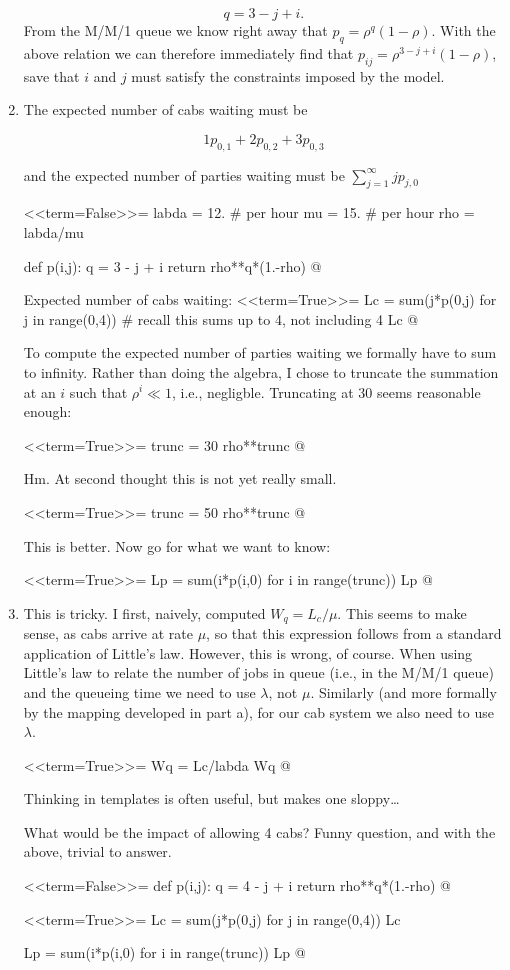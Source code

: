 \begin{question}
\begin{solution}
\begin{enumerate}
\begin{equation*}
q = 3 - j +i.
\end{equation*}
From the M/M/1 queue we know right away that $p_q = \rho^q
(1-\rho)$.  With the above relation we can therefore immediately find
that $p_{ij} = \rho^{3-j+i}(1-\rho)$, save that $i$ and
$j$ must satisfy the constraints imposed by the model.
\item       
The expected number of cabs waiting must be 

\begin{equation*}
1p_{0,1} + 2 p_{0,2} + 3p_{0,3}
\end{equation*}

and the expected number of parties waiting must be $\sum_{j=1}^\infty j p_{j,0}$

<<term=False>>=
labda = 12. # per hour
mu = 15. # per hour
rho = labda/mu

def p(i,j):
    q  = 3 - j + i
    return rho**q*(1.-rho)
@ 

Expected number of  cabs waiting:
<<term=True>>=
Lc = sum(j*p(0,j) for j in range(0,4)) # recall this sums up to 4, not including 4
Lc
@ 


To compute the expected number of parties waiting we formally have to
sum to infinity. Rather than doing the algebra, I chose to truncate
the summation at an $i$ such that $\rho^i \ll 1$, i.e.,
negligble.  Truncating at 30 seems reasonable enough:

<<term=True>>=
trunc = 30
rho**trunc
@ 

Hm. At second thought this is not yet really small. 

<<term=True>>=
trunc = 50
rho**trunc
@ 


This is better. Now go for what we want to know:

<<term=True>>=
Lp = sum(i*p(i,0) for i in range(trunc))
Lp
@ 

\item 
This is tricky. I first, naively, computed $W_q = L_c/\mu$. This
seems to make sense, as cabs arrive at rate $\mu$, so that this
expression follows from a standard application of Little's
law. However, this is wrong, of course. When using Little's law to
relate the number of jobs in queue (i.e., in the M/M/1 queue) and the
queueing time we need to use $\lambda$, not
$\mu$. Similarly (and more formally by the mapping developed in
part a), for our cab system we also need to use $\lambda$.

<<term=True>>=
Wq = Lc/labda
Wq
@ 

Thinking in templates is often useful, but makes one sloppy\ldots

What would be the impact of allowing 4 cabs? Funny question, and with the above, trivial to answer.

<<term=False>>=
def p(i,j):
    q  = 4 - j + i
    return rho**q*(1.-rho)
@ 

<<term=True>>=
Lc = sum(j*p(0,j) for j in range(0,4))
Lc

Lp = sum(i*p(i,0) for i in range(trunc))
Lp
@ 
  \end{enumerate}
    \end{solution}
\end{question}

